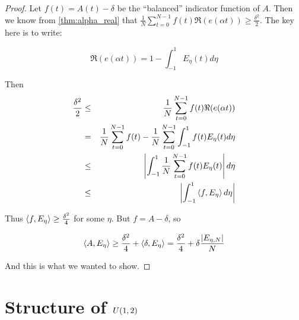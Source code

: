 \documentclass{article}
\theoremstyle{definition}
\theoremstyle{remark}
\numberwithin{equation}{section}
\begin{document}
\begin{proof}
  Let $f(t) = A(t) - \delta$ be the ``balanced'' indicator function of
  $A$.  Then we know from \ref{thm:alpha_real} that $\frac{1}{N}\sum_{t=0}^{N-1}
  f(t)\Re(e(\alpha t)) \geq \frac{\delta^2}{2}$.  The key here is to
  write: 

  \[\Re(e(\alpha t)) = 1-\int_{-1}^1 E_\eta(t)d\eta\]

  Then 
  \begin{eqnarray*}
    \frac{\delta^2}{2} &\leq& \frac{1}{N}\sum_{t=0}^{N-1}
                              f(t)\Re(e(\alpha t)) \\
                       &=& \frac{1}{N}\sum_{t=0}^{N-1}
                           f(t) -  \frac{1}{N}\sum_{t=0}^{N-1}
                           \int_{-1}^1 f(t) E_\eta(t)d\eta\\
                       &\leq& \left|\int_{-1}^1 \frac{1}{N}\sum_{t=0}^{N-1} f(t) E_\eta(t)\right|d\eta\\
                       &\leq& \left|\int_{-1}^1 \left<f, E_\eta\right> d\eta\right|
\end{eqnarray*}

Thus $\left<f, E_\eta\right> \geq \frac{\delta^2}{4}$ for some $\eta$.  But
$f = A - \delta$, so 

\[\left<A, E_\eta\right> \geq \frac{\delta^2}{4} + \left<\delta, E_\eta\right> =
  \frac{\delta^2}{4} + \delta \frac{|E_{\eta,N}|}{N}\]

And this is what we wanted to show.
\end{proof}

\section{Structure of $U(1,2)$}
\end{document}
